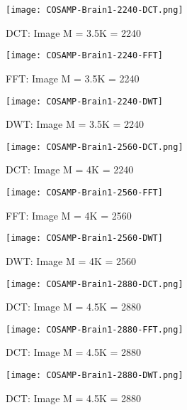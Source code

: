 \documentclass[titlepage,oneside, 12pt]{book}
\theoremstyle{break}
\begin{document}
\begin{figure}[H]
\centering
{}
  \texttt{[image: COSAMP-Brain1-2240-DCT.png]}
  \caption{DCT: Image M = 3.5K = 2240}\label{fig:COSAMP-Brain1-2240-DCT}
\endminipage
\hspace*{2em}
  \texttt{[image: COSAMP-Brain1-2240-FFT]}
  \caption{FFT: Image M = 3.5K = 2240}\label{fig:COSAMP-Brain1-2240-FFT}
\endminipage
\hspace*{2em}
%
  \texttt{[image: COSAMP-Brain1-2240-DWT]}
  \caption{DWT: Image M = 3.5K = 2240}\label{fig:COSAMP-Brain1-2240-DWT}
\endminipage
\hspace*{2em}
\end{figure}

\clearpage

\begin{figure}[!h]
\centering
{}
  \texttt{[image: COSAMP-Brain1-2560-DCT.png]}
  \caption{DCT: Image M = 4K = 2240}\label{fig:COSAMP-Brain1-2560-DCT}
\endminipage
\hspace*{2em}
  \texttt{[image: COSAMP-Brain1-2560-FFT]}
  \caption{FFT: Image M = 4K = 2560}\label{fig:COSAMP-Brain1-2560-FFT}
\endminipage
\hspace*{2em}
%
  \texttt{[image: COSAMP-Brain1-2560-DWT]}
  \caption{DWT: Image M = 4K = 2560}\label{fig:COSAMP-Brain1-2560-DWT}
\endminipage
\hspace*{2em}
\end{figure}


\begin{figure}[!h]
\centering
{}
  \texttt{[image: COSAMP-Brain1-2880-DCT.png]}
  \caption{DCT: Image M = 4.5K = 2880}\label{fig:COSAMP-Brain1-2880-DCT}
\endminipage
\hspace*{2em}
  \texttt{[image: COSAMP-Brain1-2880-FFT.png]}
  \caption{DCT: Image M = 4.5K = 2880}\label{fig:COSAMP-Brain1-2880-FFT}
\endminipage
\hspace*{2em}
  \texttt{[image: COSAMP-Brain1-2880-DWT.png]}
  \caption{DCT: Image M = 4.5K = 2880}\label{fig:COSAMP-Brain1-2880-DWT}
\endminipage
\hspace*{2em}
\end{figure}
\end{document}

